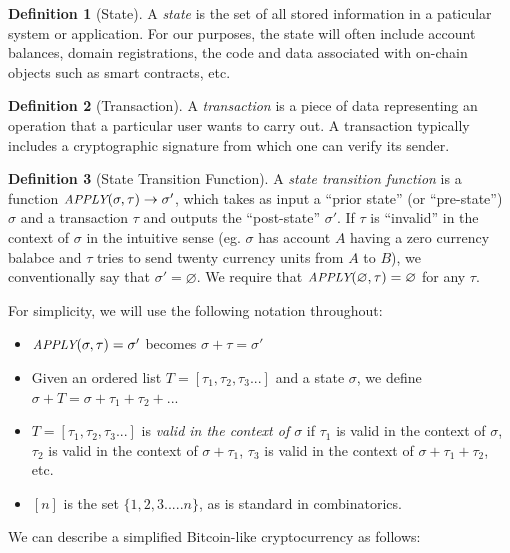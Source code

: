 \documentclass[11pt,a4paper]{article}
\theoremstyle{plain}
\theoremstyle{definition}
\newtheorem{defn}{Definition}[section]
\theoremstyle{remark}
\newcommand{\makeintoafunction}[1]{\textit{\uppercase{\small #1}}}
\newcommand{\APPLY}{\makeintoafunction{apply}}
\begin{document}
\begin{defn}[State]
A \emph{state} is the set of all stored information in a paticular system or application. For our purposes, the state will often include account balances, domain registrations, the code and data associated with on-chain objects such as smart contracts, etc.
\end{defn}

\begin{defn}[Transaction]
A \emph{transaction} is a piece of data representing an operation that a particular user wants to carry out. A transaction typically includes a cryptographic signature from which one can verify its sender.
\end{defn}

\begin{defn}[State Transition Function]
A \emph{state transition function} is a function $\APPLY(\sigma, \tau) \rightarrow \sigma'$, which takes as input a ``prior state'' (or ``pre-state'') $\sigma$ and a transaction $\tau$ and outputs the ``post-state'' $\sigma'$. If $\tau$ is ``invalid'' in the context of $\sigma$ in the intuitive sense (eg. $\sigma$ has account $A$ having a zero currency balabce and $\tau$ tries to send twenty currency units from $A$ to $B$), we conventionally say that $\sigma' = \varnothing$. We require that $\APPLY(\varnothing, \tau) = \varnothing$ for any $\tau$.
\end{defn}

For simplicity, we will use the following notation throughout:

\begin{itemize}
\item
$\APPLY(\sigma, \tau) = \sigma'$ becomes $\sigma + \tau = \sigma'$
\item  
Given an ordered list $T = [\tau_1, \tau_2, \tau_3...]$ and a state $\sigma$, we define $\sigma + T = \sigma + \tau_1 + \tau_2 + ...$
\item
$T = [\tau_1, \tau_2, \tau_3 ...]$ is \emph{valid in the context of $\sigma$} if $\tau_1$ is valid in the context of $\sigma$, $\tau_2$ is valid in the context of $\sigma + \tau_1$, $\tau_3$ is valid in the context of $\sigma + \tau_1 + \tau_2$, etc.
\item
$[n]$ is the set $\{1, 2, 3..... n\}$, as is standard in combinatorics.
\end{itemize}

We can describe a simplified Bitcoin-like cryptocurrency as follows:
\end{document}
